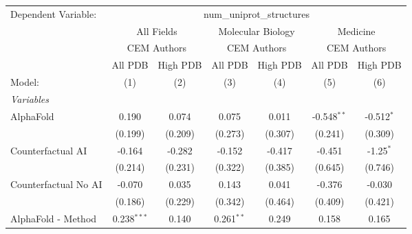 \begingroup
\centering
\begin{tabular}{lcccccc}
   \tabularnewline \midrule \midrule
   Dependent Variable: & \multicolumn{6}{c}{num\_uniprot\_structures}\\
 & \multicolumn{2}{c}{All Fields} & \multicolumn{2}{c}{Molecular Biology} & \multicolumn{2}{c}{Medicine} \\
\cmidrule(lr){2-3} \cmidrule(lr){4-5} \cmidrule(lr){6-7}
 & \multicolumn{2}{c}{CEM Authors} & \multicolumn{2}{c}{CEM Authors} & \multicolumn{2}{c}{CEM Authors} \\
\cmidrule(lr){2-3} \cmidrule(lr){4-5} \cmidrule(lr){6-7}
 & \multicolumn{1}{c}{All PDB} & \multicolumn{1}{c}{High PDB} & \multicolumn{1}{c}{All PDB} & \multicolumn{1}{c}{High PDB} & \multicolumn{1}{c}{All PDB} & \multicolumn{1}{c}{High PDB} \\
\cmidrule(lr){2-2} \cmidrule(lr){3-3} \cmidrule(lr){4-4} \cmidrule(lr){5-5} \cmidrule(lr){6-6} \cmidrule(lr){7-7}
   Model:                                                     & (1)           & (2)          & (3)            & (4)            & (5)           & (6)\\  
   \midrule
   \emph{Variables}\\
   AlphaFold                                                  & 0.190         & 0.074        & 0.075          & 0.011          & -0.548$^{**}$ & -0.512$^{*}$\\   
                                                              & (0.199)       & (0.209)      & (0.273)        & (0.307)        & (0.241)       & (0.309)\\   
   Counterfactual AI                                          & -0.164        & -0.282       & -0.152         & -0.417         & -0.451        & -1.25$^{*}$\\   
                                                              & (0.214)       & (0.231)      & (0.322)        & (0.385)        & (0.645)       & (0.746)\\   
   Counterfactual No AI                                       & -0.070        & 0.035        & 0.143          & 0.041          & -0.376        & -0.030\\   
                                                              & (0.186)       & (0.229)      & (0.342)        & (0.464)        & (0.409)       & (0.421)\\   
   AlphaFold - Method                                         & 0.238$^{***}$ & 0.140        & 0.261$^{**}$   & 0.249          & 0.158         & 0.165\\   

\end{tabular}
